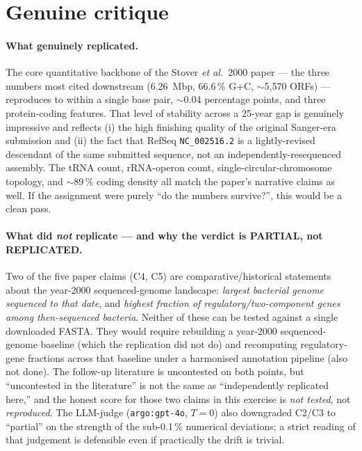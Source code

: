 \documentclass[11pt,letterpaper]{article}
\begin{document}
\section{Genuine critique}

\paragraph{What genuinely replicated.} The core quantitative backbone of
the Stover \emph{et al.}\ 2000 paper --- the three numbers most cited
downstream (6.26~Mbp, 66.6\,\% G+C, $\sim$5{,}570 ORFs) --- reproduces
to within a single base pair, $\sim$0.04 percentage points, and three
protein-coding features. That level of stability across a 25-year gap
is genuinely impressive and reflects (i) the high finishing quality of
the original Sanger-era submission and (ii) the fact that RefSeq
\texttt{NC\_002516.2} is a lightly-revised descendant of the same
submitted sequence, not an independently-resequenced assembly. The
tRNA count, rRNA-operon count, single-circular-chromosome topology, and
$\sim$89\,\% coding density all match the paper's narrative claims as
well. If the assignment were purely ``do the numbers survive?'', this
would be a clean pass.

\paragraph{What did \emph{not} replicate --- and why the verdict is
PARTIAL, not REPLICATED.} Two of the five paper claims (C4, C5) are
comparative/historical statements about the year-2000 sequenced-genome
landscape: \emph{largest bacterial genome sequenced to that date}, and
\emph{highest fraction of regulatory/two-component genes among
then-sequenced bacteria}. Neither of these can be tested against a
single downloaded FASTA. They would require rebuilding a year-2000
sequenced-genome baseline (which the replication did not do) and
recomputing regulatory-gene fractions across that baseline under a
harmonised annotation pipeline (also not done). The follow-up literature
is uncontested on both points, but ``uncontested in the literature'' is
not the same as ``independently replicated here,'' and the honest score
for those two claims in this exercise is \emph{not tested}, not
\emph{reproduced}. The LLM-judge (\texttt{argo:gpt-4o}, $T=0$) also
downgraded C2/C3 to ``partial'' on the strength of the sub-0.1\,\%
numerical deviations; a strict reading of that judgement is defensible
even if practically the drift is trivial.
\end{document}
